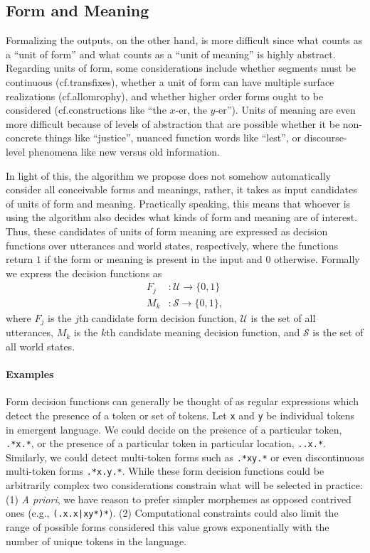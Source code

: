 \subsection{Form and Meaning}

Formalizing the outputs, on the other hand, is more difficult since what counts as a ``unit of form'' and what counts as a ``unit of meaning'' is highly abstract.
Regarding units of form, some considerations include whether segments must be continuous (cf.\@ transfixes), whether a unit of form can have multiple surface realizations (cf.\@ allomrophy), and whether higher order forms ought to be considered (cf.\@ constructions like ``the $x$-er, the $y$-er'').
Units of meaning are even more difficult because of levels of abstraction that are possible whether it be non-concrete things like ``justice'', nuanced function words like ``lest'', or discourse-level phenomena like new versus old information.

In light of this, the algorithm we propose does not somehow automatically consider all conceivable forms and meanings, rather, it takes as input candidates of units of form and meaning.
Practically speaking, this means that whoever is using the algorithm also decides what kinds of form and meaning are of interest.
Thus, these candidates of units of form meaning are expressed as decision functions over utterances and world states, respectively,
  where the functions return $1$ if the form or meaning is present in the input and $0$ otherwise.
Formally we express the decision functions as
\begin{align}
  F_j &: \mathcal U \rightarrow \{0,1\} \\
  M_k &: \mathcal S \rightarrow \{0,1\}
  ,
\end{align}
where
  $F_j$ is the $j$th candidate form decision function,
  $\mathcal U$ is the set of all utterances,
  $M_k$ is the $k$th candidate meaning decision function,
  and $\mathcal S$ is the set of all world states.

\newcommand\ttt\texttt
\paragraph{Examples}
Form decision functions can generally be thought of as regular expressions which detect the presence of a token or set of tokens.
Let \ttt x  and \ttt y be individual tokens in emergent language.
We could decide on the presence of a particular token, \ttt{.*x.*}, or the presence of a particular token in particular location, \ttt{..x.*}.
Similarly, we could detect multi-token forms such as \ttt{.*xy.*} or even discontinuous multi-token forms \ttt{.*x.y.*}.
While these form decision functions could be arbitrarily complex two considerations constrain what will be selected in practice:
  (1) \emph{A priori}, we have reason to prefer simpler morphemes as opposed contrived ones (e.g., \ttt{(.x.x|xy*)*}).
  (2) Computational constraints could also limit the range of possible forms considered this value grows exponentially with the number of unique tokens in the language.

